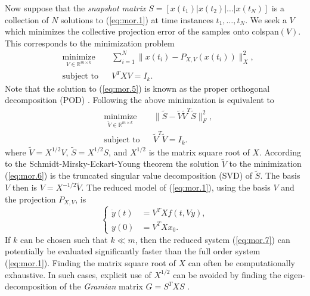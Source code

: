 Now suppose that the \emph{snapshot matrix} $S=[x(t_1)|x(t_2)|\ldots|x(t_N)]$ is a collection of $N$ solutions to (\ref{eq:mor.1}) at time instances $t_1,\dots,t_N$. We seek a $V$ which minimizes the collective projection error of the samples onto colspan$(V)$. This corresponds to the minimization problem
\begin{equation} \label{eq:mor.5}
\begin{aligned}
& \underset{V\in \mathbb{R}^{m\times k}}{\text{minimize}}
& & \sum_{i=1}^N \| x(t_i) - P_{X,V}( x(t_i) ) \|_X^2, \\
& \text{subject to}
& & V^TXV = I_k.
\end{aligned}
\end{equation}
Note that the solution to (\ref{eq:mor.5}) is known as the proper orthogonal decomposition (POD) \cite{hesthaven2015certified,quarteroni2015reduced,gubisch2017proper}. Following \cite{quarteroni2015reduced} the above minimization is equivalent to
\begin{equation} \label{eq:mor.6}
\begin{aligned}
& \underset{\tilde V\in \mathbb{R}^{m\times k}}{\text{minimize}}
& & \| \tilde S - \tilde V \tilde V^T \tilde S \|_F^2, \\
& \text{subject to}
& & \tilde V^T\tilde V = I_k.
\end{aligned}
\end{equation}
where $\tilde V = X^{1/2} V$, $\tilde S = X^{1/2} S$, and $X^{1/2}$ is the matrix square root of $X$. According to the Schmidt-Mirsky-Eckart-Young theorem \cite{Markovsky:2011:LRA:2103589} the solution $\tilde V$ to the minimization (\ref{eq:mor.6}) is the truncated singular value decomposition (SVD) of $\tilde S$. The basis $V$ then is $V = X^{-1/2}\tilde V$. The reduced model of (\ref{eq:mor.1}), using the basis $V$ and the projection $P_{X,V}$, is
\begin{equation} \label{eq:mor.7}
	\left\{
	\begin{aligned}
	\dot y(t) &= V^TX f(t,Vy), \\
	y(0) &= V^TX x_0.
	\end{aligned}
	\right.
\end{equation}
If $k$ can be chosen such that $k \ll m$, then the reduced system (\ref{eq:mor.7}) can potentially be evaluated significantly faster than the full order system (\ref{eq:mor.1}). Finding the matrix square root of $X$ can often be computationally exhaustive. In such cases, explicit use of $X^{1/2}$ can be avoided by finding the eigen-decomposition of the \emph{Gramian} matrix $G = S^TXS$ \cite{quarteroni2015reduced,Haasdonk2017}.

